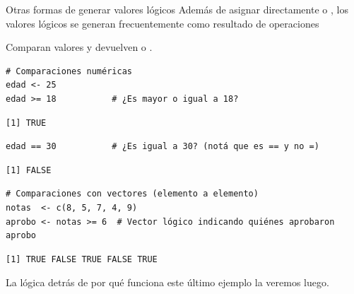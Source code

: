 \documentclass[8pt]{beamer}
\begin{document}
\begin{frame}[fragile]{Otras formas de generar valores lógicos}
Además de asignar directamente  o , los valores lógicos se generan frecuentemente como resultado de operaciones
\end{frame}







\begin{frame}[fragile]{}
	Comparan valores y devuelven  o . 
\begin{lstlisting}[style=RScript]
# Comparaciones numéricas
edad <- 25
edad >= 18           # ¿Es mayor o igual a 18?
\end{lstlisting}
\begin{lstlisting}[style=RConsole]
[1] TRUE
\end{lstlisting}	
\begin{lstlisting}[style=RScript]
edad == 30           # ¿Es igual a 30? (notá que es == y no =)
\end{lstlisting}
\begin{lstlisting}[style=RConsole]
[1] FALSE	
\end{lstlisting}

\begin{lstlisting}[style=RScript]
# Comparaciones con vectores (elemento a elemento)
notas  <- c(8, 5, 7, 4, 9)
aprobo <- notas >= 6  # Vector lógico indicando quiénes aprobaron	
aprobo
\end{lstlisting}
\begin{lstlisting}[style=RConsole]
[1] TRUE FALSE TRUE FALSE TRUE
\end{lstlisting}

La lógica detrás de por qu\'e funciona este último ejemplo la veremos luego.
\end{frame}
\end{document}
